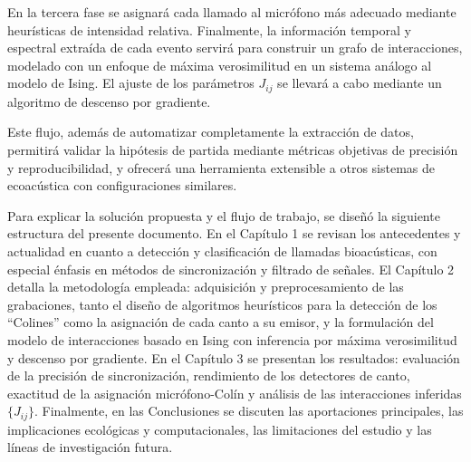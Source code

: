 En la tercera fase se asignará cada 
llamado al micrófono más adecuado mediante heurísticas de 
intensidad relativa. 
Finalmente, la información temporal y espectral extraída de cada 
evento servirá para construir un grafo de interacciones, 
modelado con un enfoque de máxima verosimilitud en un sistema 
análogo al modelo de Ising. El ajuste de los 
parámetros \(J_{ij}\) se llevará a cabo mediante un algoritmo de 
descenso por gradiente.  

Este flujo, además de automatizar completamente la extracción de 
datos, permitirá validar la hipótesis de partida mediante 
métricas objetivas de precisión y reproducibilidad, y ofrecerá 
una herramienta extensible a otros sistemas de ecoacústica con 
configuraciones similares.  


Para explicar la solución propuesta y el flujo de trabajo, 
se diseñó la siguiente estructura del presente documento. 
En el Capítulo 1 se revisan los antecedentes y actualidad en cuanto a 
detección y 
clasificación de llamadas bioacústicas, con especial énfasis 
en métodos de sincronización y filtrado de señales. 
El Capítulo 2 detalla la metodología empleada: adquisición y 
preprocesamiento de las grabaciones, tanto el diseño de 
algoritmos heurísticos 
para la detección de los “Colines” como la asignación de cada 
canto a su emisor, y la formulación del modelo de interacciones 
basado en Ising con inferencia por máxima verosimilitud y 
descenso por gradiente. En el Capítulo 3 se presentan los 
resultados: evaluación de la precisión de 
sincronización, rendimiento de los detectores de canto, 
exactitud de la asignación micrófono-Colín y análisis de las 
interacciones inferidas \(\{J_{ij}\}\). Finalmente, en las 
Conclusiones se discuten las aportaciones principales, las 
implicaciones ecológicas y computacionales, las limitaciones 
del estudio y las líneas de investigación futura.  





